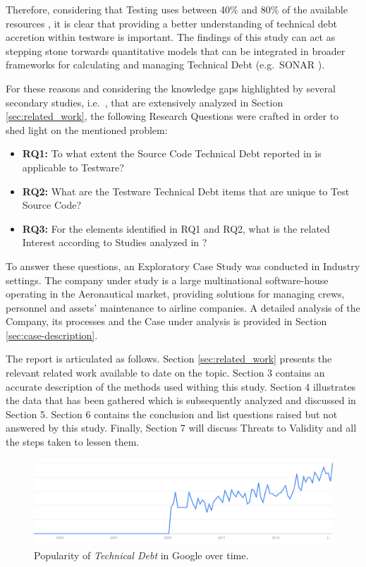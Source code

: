 Therefore, considering that Testing uses between 40\% and 80\% of the available resources \cite{exploratorying_testing_td}, it is clear that providing a better understanding of technical debt accretion within testware is important. The findings of this study can act as stepping stone torwards quantitative models that can be integrated in broader frameworks for calculating and managing Technical Debt (e.g.\ SONAR \cite{sonar_evaluate_td}).

For these reasons and considering the knowledge gaps highlighted by several secondary studies, i.e.\ \cite{mapping_study_td, exploration_of_td, exploration_of_td2}, that are extensively analyzed in Section \ref{sec:related_work}, the following Research Questions were crafted in order to shed light on the mentioned problem:

\begin{itemize}
    \itemsep0em 
    
    \item \textbf{RQ1:} To what extent the Source Code Technical Debt reported in \cite{mapping_study_td} is applicable to Testware?
    
    \item \textbf{RQ2:} What are the Testware Technical Debt items that are unique to Test Source Code?
    
    \item \textbf{RQ3:} For the elements identified in RQ1 and RQ2, what is the related Interest according to Studies analyzed in \cite{mapping_study_td}?
    
\end{itemize}


To answer these questions, an Exploratory Case Study was conducted in Industry settings. The company under study is a large multinational software-house operating in the Aeronautical market, providing solutions for managing crews, personnel and assets' maintenance to airline companies. A detailed analysis of the Company, its processes and the Case under analysis is provided in Section \ref{sec:case-description}.

The report is articulated as follows. Section \ref{sec:related_work} presents the relevant related work available to date on the topic. Section 3 contains an accurate description of the methods used withing this study. Section 4 illustrates the data that has been gathered which is subsequently analyzed and discussed in Section 5. Section 6 contains the conclusion and list questions raised but not answered by this study. Finally, Section 7 will discuss Threats to Validity and all the steps taken to lessen them.

\begin{figure}[!htbp]
    \centering
    \includegraphics[width=\textwidth]{figure/technicalDebt.pdf}
    \caption{Popularity of \textit{Technical Debt} in Google over time.}
    \label{fig:technical_debt_trend}
\end{figure}
